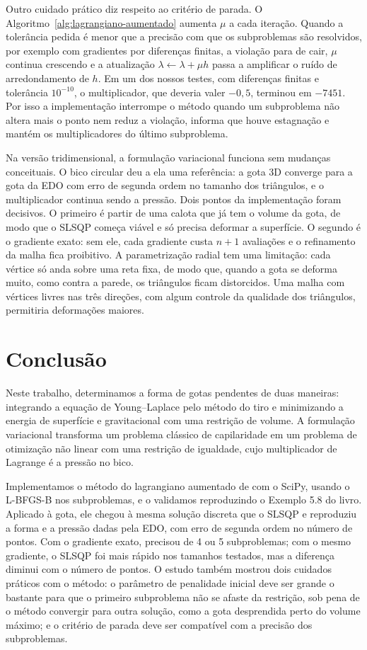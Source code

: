 \documentclass[12pt, oneside, a4paper, english, brazil]{abntex2}
\theoremstyle{relatorio}
\theoremstyle{relatorioit}
\theoremstyle{problema}
\begin{document}
Outro cuidado prático diz respeito ao critério de parada. O
Algoritmo~\ref{alg:lagrangiano-aumentado} aumenta $\mu$ a cada iteração. Quando a
tolerância pedida é menor que a precisão com que os subproblemas são resolvidos, por
exemplo com gradientes por diferenças finitas, a violação para de cair, $\mu$ continua
crescendo e a atualização $\lambda \leftarrow \lambda + \mu h$ passa a amplificar o
ruído de arredondamento de $h$. Em um dos nossos testes, com diferenças finitas e
tolerância $10^{-10}$, o multiplicador, que deveria valer $-0{,}5$, terminou em
$-7451$. Por isso a implementação interrompe o método quando um subproblema não altera
mais o ponto nem reduz a violação, informa que houve estagnação e mantém os
multiplicadores do último subproblema.

Na versão tridimensional, a formulação variacional funciona sem mudanças conceituais.
O bico circular deu a ela uma referência: a gota 3D converge para a gota da EDO com
erro de segunda ordem no tamanho dos triângulos, e o multiplicador continua sendo a
pressão. Dois pontos da implementação foram decisivos. O primeiro é partir de uma
calota que já tem o volume da gota, de modo que o SLSQP começa viável e só precisa
deformar a superfície. O segundo é o gradiente exato: sem ele, cada gradiente custa
$n + 1$ avaliações e o refinamento da malha fica proibitivo. A parametrização radial
tem uma limitação: cada vértice só anda sobre uma reta fixa, de modo que, quando a gota
se deforma muito, como contra a parede, os triângulos ficam distorcidos. Uma malha
com vértices livres nas três direções, com algum controle da qualidade dos triângulos,
permitiria deformações maiores.

\chapter{Conclusão}

Neste trabalho, determinamos a forma de gotas pendentes de duas maneiras: integrando a
equação de Young--Laplace pelo método do tiro e minimizando a energia de superfície e
gravitacional com uma restrição de volume. A formulação variacional transforma um
problema clássico de capilaridade em um problema de otimização não linear com uma
restrição de igualdade, cujo multiplicador de Lagrange é a pressão no bico.

Implementamos o método do lagrangiano aumentado de \textcite{martins2021} com o SciPy,
usando o L-BFGS-B nos subproblemas, e o validamos reproduzindo o Exemplo 5.8 do livro.
Aplicado à gota, ele chegou à mesma solução discreta que o SLSQP e reproduziu a forma e
a pressão dadas pela EDO, com erro de segunda ordem no número de pontos. Com o
gradiente exato, precisou de 4 ou 5 subproblemas; com o mesmo gradiente, o SLSQP foi
mais rápido nos tamanhos testados, mas a diferença diminui com o número de pontos. O estudo também mostrou dois cuidados práticos com o
método: o parâmetro de penalidade inicial deve ser grande o bastante para que o
primeiro subproblema não se afaste da restrição, sob pena de o método convergir para
outra solução, como a gota desprendida perto do volume máximo; e o critério de parada
deve ser compatível com a precisão dos subproblemas.
\end{document}
